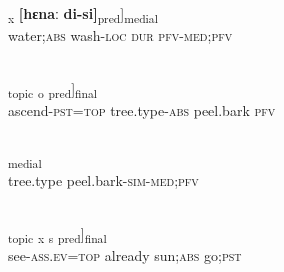\documentclass[output=paper]{LSP/langsci}
\begin{document}
\begin{appendixexe}
 \ex \label{Aiex:App25}
\gll [\textbf{[[haːnaː]}\textsubscript{o}	\textbf{[muːluː-wɛː]}\textsubscript{pred}]\textsubscript{x}	\textbf{[hɛnaː}	\textbf{di-si]}\textsubscript{pred}]\textsubscript{medial}\\
water;\textsc{abs}	wash-\textsc{loc}	\textsc{dur}	\textsc{pfv}-\textsc{med};\textsc{pfv}\\
\glt {}\\
\end{appendixexe}

\begin{appendixexe}
 \ex \label{Aiex:App26}	
\gll [[ɸiliː-nɛː=jaː]\textsubscript{topic}	\underline{}\textsubscript{o}	\underline{\smash{[solaː}}	\underline{\smash{di]}}\textsubscript{pred}]\textsubscript{final}\\
ascend-\textsc{pst}=\textsc{top}	tree.type-\textsc{abs}	peel.bark	\textsc{pfv}\\
\glt {}\\
\end{appendixexe}

	
\begin{appendixexe}
 \ex \label{Aiex:App27}	
\textsubscript{medial}\\
tree.type	peel.bark-\textsc{sim}-\textsc{med};\textsc{pfv}\\
‎‎\glt {}\\
\end{appendixexe}

\begin{appendixexe}
 \ex \label{Aiex:App28}
\gll [[bɛdaː-loːlu=waː]\textsubscript{topic}	\underline{\smash{[ɛimɛ]}}\textsubscript{x}	\underline{\smash{[oːɸaː]}}\textsubscript{s}	\underline{\smash{[aːnɛː]}}\textsubscript{pred}]\textsubscript{final}\\
see-\textsc{ass.ev}=\textsc{top}	already	sun;\textsc{abs}	go;\textsc{pst}\\
\glt {}\\
\end{appendixexe}
\end{document}
